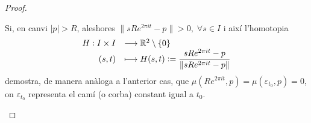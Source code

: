 \documentclass[../main.tex]{subfiles}
\begin{document}
\begin{proof}
\begin{enumerate}[(a)]
    Si, en canvi $|p|>R$, aleshores $\|sRe^{2\pi it}-p\|>0,\;\forall s\in I$ i així l'homotopia
    \begin{equation}
        \notag
        \begin{array}{rl}
            H:I\times I & \longrightarrow \mathbb{R}^2\setminus\{0\} \\
            (s,t) & \longmapsto H(s,t):=\dfrac{sRe^{2\pi it}-p}{\|sRe^{2\pi it}-p\|}
        \end{array}
    \end{equation}
    demostra, de manera anàloga a l'anterior cas, que $\mu(Re^{2\pi it},p)=\mu(\varepsilon_{t_0},p)=0$, on $\varepsilon_{t_0}$ representa el camí (o corba) constant igual a $t_0$.
\end{enumerate}
\end{proof}
\end{document}
